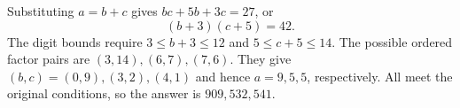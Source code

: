 Substituting $a=b+c$ gives $bc+5b+3c=27$, or
\[
(b+3)(c+5)=42.
\]
The digit bounds require $3\le b+3\le12$ and $5\le c+5\le14$. The possible ordered factor pairs are $(3,14),(6,7),(7,6)$. They give $(b,c)=(0,9),(3,2),(4,1)$ and hence $a=9,5,5$, respectively. All meet the original conditions, so the answer is $\boxed{909,532,541}$.
